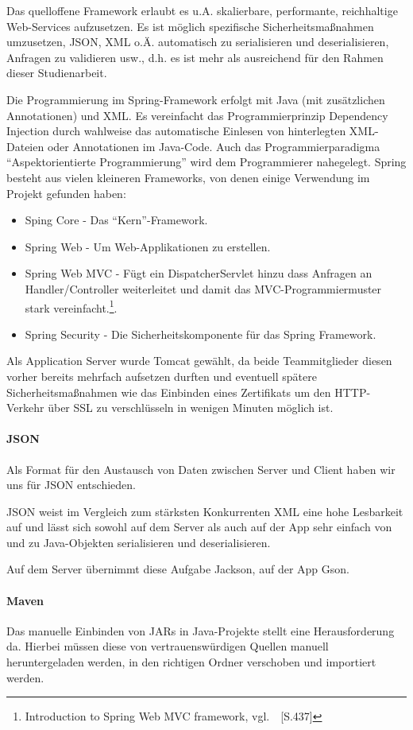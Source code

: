 Das quelloffene Framework erlaubt es u.A. skalierbare, performante, reichhaltige Web-Services aufzusetzen. Es ist möglich spezifische Sicherheitsmaßnahmen umzusetzen, JSON, XML o.Ä. automatisch zu serialisieren und deserialisieren, Anfragen zu validieren usw., d.h. es ist mehr als ausreichend für den Rahmen dieser Studienarbeit.

Die Programmierung im Spring-Framework erfolgt mit Java (mit zusätzlichen Annotationen) und XML. Es vereinfacht das Programmierprinzip Dependency Injection durch wahlweise das automatische Einlesen von hinterlegten XML-Dateien oder Annotationen im Java-Code. Auch das Programmierparadigma ``Aspektorientierte Programmierung'' wird dem Programmierer nahegelegt.
Spring besteht aus vielen kleineren Frameworks, von denen einige Verwendung im Projekt gefunden haben:
\begin{itemize}
\item Sping Core - Das ``Kern''-Framework.
\item Spring Web - Um Web-Applikationen zu erstellen.
\item Spring Web MVC - Fügt ein DispatcherServlet hinzu dass Anfragen an Handler/Controller weiterleitet und damit das MVC-Programmiermuster stark vereinfacht.\footnote{Introduction to Spring Web MVC framework, vgl.~\cite{webmvc}~[S.437]}. 
\item Spring Security - Die Sicherheitskomponente für das Spring Framework.
\end{itemize}

Als Application Server wurde Tomcat gewählt, da beide Teammitglieder diesen vorher bereits mehrfach aufsetzen durften und eventuell spätere Sicherheitsmaßnahmen wie das Einbinden eines Zertifikats um den HTTP-Verkehr über SSL zu verschlüsseln in wenigen Minuten möglich ist.
\paragraph{JSON}
Als Format für den Austausch von Daten zwischen Server und Client haben wir uns für JSON entschieden.

JSON weist im Vergleich zum stärksten Konkurrenten XML eine hohe Lesbarkeit auf und lässt sich sowohl auf dem Server als auch auf der App sehr einfach von und zu Java-Objekten serialisieren und deserialisieren.

Auf dem Server übernimmt diese Aufgabe Jackson, auf der App Gson.
\paragraph{Maven}
Das manuelle Einbinden von JARs in Java-Projekte stellt eine Herausforderung da. Hierbei müssen diese von vertrauenswürdigen Quellen manuell heruntergeladen werden, in den richtigen Ordner verschoben und importiert werden.

